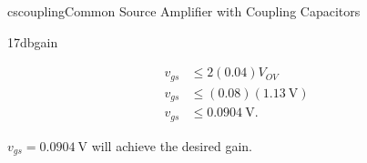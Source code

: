 \begin{mainquestion}{cscoupling}{Common Source Amplifier with Coupling Capacitors}
\begin{partquestion}{17dbgain}
\begin{answer}
\begin{align*}
v_{gs} &\leq 2(0.04)V_{OV}\\
v_{gs} &\leq (0.08)(\qty{1.13}{\volt})\\
v_{gs} &\leq \qty{0.0904}{\volt}.
\end{align*}

$v_{gs} = \qty{0.0904}{\volt}$ will achieve the desired gain.
\end{answer}
\end{partquestion}

\end{mainquestion}
